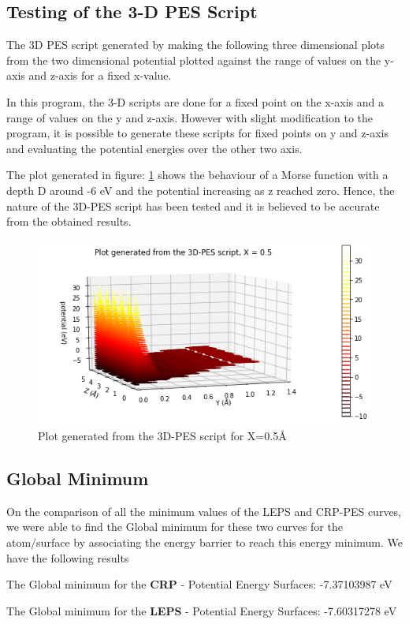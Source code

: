 \documentclass[12pt]{article}
\begin{document}
\pagebreak
\subsection{Testing of the 3-D PES Script}

The 3D PES script generated by making the following three dimensional plots from the two dimensional potential plotted against the range of values on the y-axis and z-axis for a fixed x-value. 

In this program, the 3-D scripts are done for a fixed point on the x-axis and a range of values on the y and z-axis. However with slight modification to the program, it is possible to generate these scripts for fixed points on y and z-axis and evaluating the potential energies over the other two axis.

The plot generated in figure: \ref{fig:35} shows the behaviour of a Morse function with a depth D around -6 eV and the potential increasing as z reached zero. Hence, the nature of the 3D-PES script has been tested and it is believed to be accurate from the obtained results.
    
\begin{figure}[h!]
    \centering
    \includegraphics[width = \textwidth]{3d.png}
      \caption{Plot generated from the 3D-PES script for X=0.5\AA} 
    \label{fig:35}
\end{figure}     

\subsection{Global Minimum}
\vspace{5mm}
On the comparison of all the minimum values of the LEPS and CRP-PES curves, we were able to find the Global minimum for these two curves for the atom/surface by associating the
energy barrier to reach this energy minimum. We have the following results
\vspace{5mm}
\begin{center}
    The Global minimum for the \textbf{CRP}  - Potential Energy Surfaces: -7.37103987 eV
  
    The Global minimum for the \textbf{LEPS} - Potential Energy Surfaces: -7.60317278 eV
\end{center}
\end{document}
